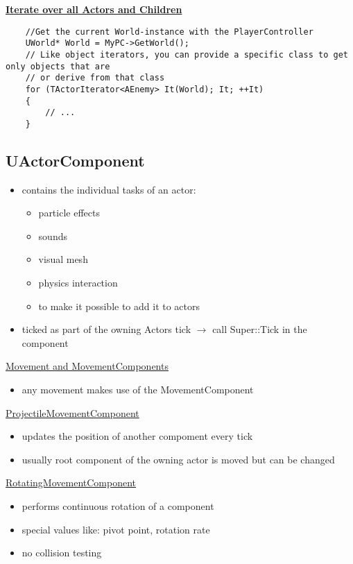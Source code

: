             \uline{\textbf{Iterate over all Actors and Children}}
            \begin{lstlisting}
    //Get the current World-instance with the PlayerController
    UWorld* World = MyPC->GetWorld();
    // Like object iterators, you can provide a specific class to get only objects that are
    // or derive from that class
    for (TActorIterator<AEnemy> It(World); It; ++It)
    {
        // ...
    }
            \end{lstlisting}


        \subsection{UActorComponent}
            \begin{itemize}
                \item contains the individual tasks of an actor:
                \begin{itemize}
                    \item particle effects
                    \item sounds
                    \item visual mesh
                    \item physics interaction
                    \item {} to make it possible to add it to actors
                \end{itemize}
                \item ticked as part of the owning Actors tick $\rightarrow$ call Super::Tick in the component
            \end{itemize}

        \uline{Movement and MovementComponents}
        \begin{itemize}
            \item any movement makes use of the MovementComponent
        \end{itemize}

        \uline{ProjectileMovementComponent}
            \begin{itemize}
                \item updates the position of another compoment every tick
                \item usually root component of the owning actor is moved but can be changed
            \end{itemize}

        \uline{RotatingMovementComponent}
            \begin{itemize}
                \item performs continuous rotation of a component
                \item special values like: pivot point, rotation rate
                \item no collision testing
            \end{itemize}


